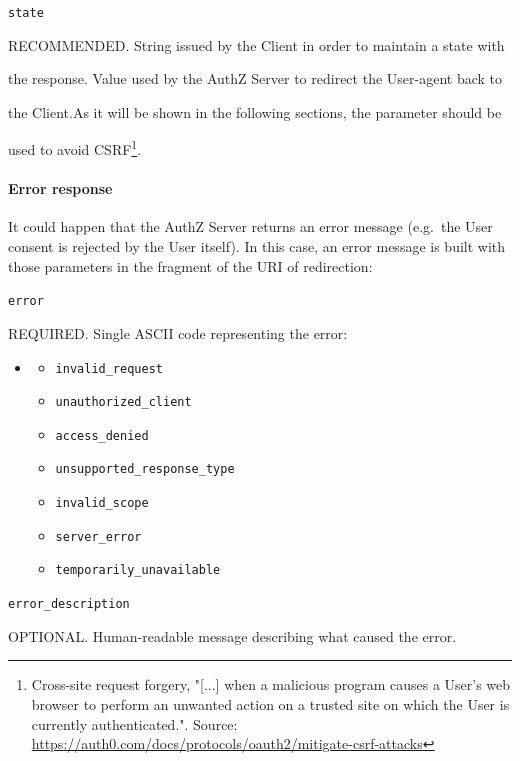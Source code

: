 \documentclass[a4paper,12pt]{article}
\def\eg{e.g.\xspace}
\begin{document}
\texttt{state}

\hspace{0.5cm}RECOMMENDED. String issued by the Client in order to maintain a state with

\hspace{0.5cm}the response. Value used by the AuthZ Server to redirect the User-agent back to

\hspace{0.5cm}the Client.As it will be shown in the following sections, the parameter should be

\hspace{0.5cm}used to avoid CSRF\footnote{Cross-site request forgery, "[...] when a malicious program causes a User's web browser to perform an unwanted action on a trusted site on which the User is currently authenticated.". Source: \url{https://auth0.com/docs/protocols/oauth2/mitigate-csrf-attacks}}.


\paragraph{Error response}
\label{tokenerr}
It could happen that the AuthZ Server returns an error message (\eg\ the User consent is rejected by the User itself). In this case, an error message is built with those parameters in the fragment of the URI of redirection:

\texttt{error}

\hspace{0.5cm}REQUIRED. Single ASCII code representing the error:

\begin{itemize}
\item[] \begin{itemize}
        \item \texttt{invalid\_request}
        \item \texttt{unauthorized\_client}
        \item \texttt{access\_denied}
        \item \texttt{unsupported\_response\_type}
        \item \texttt{invalid\_scope}
        \item \texttt{server\_error}
        \item \texttt{temporarily\_unavailable}
\end{itemize}
\end{itemize}

\texttt{error\_description}

\hspace{0.5cm}OPTIONAL. Human-readable message describing what caused the error.
\end{document}
